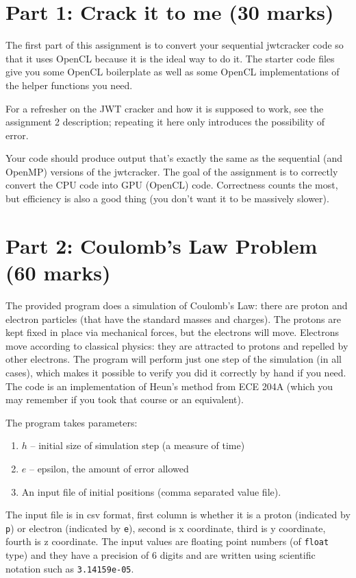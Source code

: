 \documentclass[letterpaper,10pt]{article}
\begin{document}
\section*{Part 1: Crack it to me (30 marks)}

The first part of this assignment is to convert your sequential jwtcracker code
so that it uses OpenCL because it is the ideal way to do it. The starter code
files give you some OpenCL boilerplate as well as some OpenCL implementations of
the helper functions you need.

For a refresher on the JWT cracker and how it is supposed to work, see
the assignment 2 description; repeating it here only introduces the possibility
of error. 

Your code should produce output that's exactly the same as the sequential (and
OpenMP) versions of the jwtcracker. The goal of the assignment is to correctly convert the CPU code into GPU (OpenCL) code. Correctness counts the most, but efficiency is also a good thing (you don't want it to be massively slower).

\section*{Part 2: Coulomb's Law Problem (60 marks)}

The provided program does a simulation of Coulomb's Law: there are proton and electron particles (that have the standard masses and charges). The protons are kept fixed in place via mechanical forces, but the electrons will move. Electrons move according to classical physics: they are attracted to protons and repelled by other electrons. The program will perform just one step of the simulation (in all cases), which makes it possible to verify you did it correctly by hand if you need. The code is an implementation of Heun's method from ECE 204A (which you may remember if you took that course or an equivalent).

The program takes parameters:
\begin{enumerate}
\item $h$ -- initial size of simulation step (a measure of time) 
\item $e$ -- epsilon, the amount of error allowed
\item An input file of initial positions (comma separated value file).
\end{enumerate}

The input file is in csv format, first column is whether it is a proton (indicated by \texttt{p}) or electron (indicated by \texttt{e}), second is x coordinate, third is y coordinate, fourth is z coordinate. The input values are floating point numbers (of \texttt{float} type) and they have a precision of 6 digits and are written using scientific notation such as \texttt{3.14159e-05}. 
\end{document}

